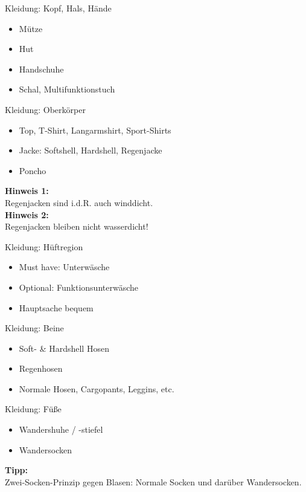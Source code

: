 \documentclass{beamer}
\newcommand{\tipp}[2][Tipp]{\vspace{0.2cm}\textbf{#1:}\\#2}
\begin{document}
			\begin{frame}{Kleidung: Kopf, Hals, Hände}
				\begin{itemize}
					\item Mütze
					\item Hut
					\item Handschuhe
					\item Schal, Multifunktionstuch
				\end{itemize}
			\end{frame}
			
			\begin{frame}{Kleidung: Oberkörper}
				\begin{itemize}
					\item Top, T-Shirt, Langarmshirt, Sport-Shirts
					\item Jacke: Softshell, Hardshell, Regenjacke
					\item Poncho
				\end{itemize}\pause
				\tipp[Hinweis 1]{Regenjacken sind i.d.R. auch winddicht.}\\\pause
				\tipp[Hinweis 2]{Regenjacken bleiben nicht wasserdicht!}
			\end{frame}
			
			\begin{frame}{Kleidung: Hüftregion}
				\begin{itemize}
					\item Must have: Unterwäsche
					\item Optional: Funktionsunterwäsche
					\item Hauptsache bequem
				\end{itemize}
			\end{frame}
			
			\begin{frame}{Kleidung: Beine}
				\begin{itemize}
					\item Soft- \& Hardshell Hosen
					\item Regenhosen
					\item Normale Hosen, Cargopants, Leggins, etc.
				\end{itemize}
			\end{frame}
			
			\begin{frame}{Kleidung: Füße}
				\begin{itemize}
					\item Wandershuhe / -stiefel
					\item Wandersocken
				\end{itemize}\pause
				\tipp{Zwei-Socken-Prinzip gegen Blasen: Normale Socken und darüber Wandersocken.}
			\end{frame}
			
\end{document}
